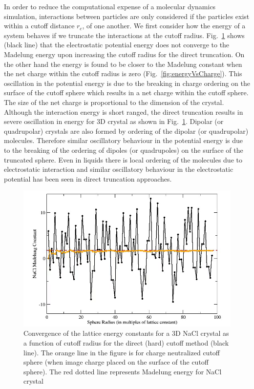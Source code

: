 In order to reduce the computational expense of a molecular dynamics simulation, interactions between particles are only considered if the particles exist within a cutoff distance $r_c$, of one another. We first consider how the energy of a system behaves if we truncate the interactions at the cutoff radius.  Fig.~\ref{fig:energyVsCutoff} shows (black line) that the electrostatic potential energy does not converge to the Madelung energy upon increasing the cutoff radius for the direct truncation. On the other hand the energy is found to be closer to the Madelung constant when the net charge within the cutoff radius is zero (Fig.~\ref{fig:energyVsCharge}). This oscillation in the potential energy is due to the breaking in charge ordering on the surface of the cutoff sphere which results in a net charge within the cutoff sphere. The size of the net charge is proportional to the dimension of the crystal. Although the interaction energy is short ranged,  the direct truncation results in severe oscillation in energy for 3D crystal as shown in Fig.~\ref{fig:energyVsCutoff}. Dipolar (or quadrupolar) crystals are also formed by ordering of the dipolar (or quadrupolar) molecules. Therefore similar oscillatory behaviour in the potential energy is due to the breaking of the ordering of dipoles (or quadrupoles) on the surface of the truncated sphere. Even in liquids there is local ordering of the molecules due to electrostatic interaction and similar oscillatory behaviour in the electrostatic potential has been seen in direct truncation approaches.

\begin{figure}[tpb]
  \begin{center}
    \centerline{\includegraphics[width = \linewidth]{energyVsCutoff.png}}
    \caption{Convergence of the lattice energy constants for a 3D NaCl crystal as a function of cutoff radius for the direct (hard) cutoff method (black line). The orange line in the figure is for charge neutralized cutoff sphere (when image charge placed on the surface of the cutoff sphere). The red dotted line represents Madelung energy for NaCl crystal}
    \label{fig:energyVsCutoff}
  \end{center}
\end{figure}

